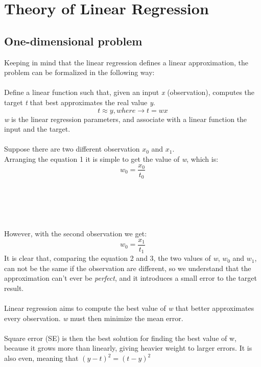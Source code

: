 \documentclass[10pt]{article}
\begin{document}
\section{Theory of Linear Regression}
\subsection{One-dimensional problem}
Keeping in mind that the linear regression defines a linear approximation, the problem can be formalized in the following way:\\\\
Define a linear function such that, given an input \textit{x} (observation), computes the target \textit{t} that best approximates the real
value \textit{y}.
\begin{equation}
    t \approx y, where \rightarrow t = wx
\end{equation}
\textit{w} is the linear regression parameters, and associate with a linear function the input and the target.\\\\
Suppose there are two different observation $x_0$ and $x_1$.\\
Arranging the equation 1 it is simple to get the value of \textit{w}, which is:
\begin{equation}
    w_0 = \frac{x_0}{t_0}
\end{equation}
\\\\\\\\\\
However, with the second observation we get:
\begin{equation}
     w_0 = \frac{x_1}{t_1}
\end{equation}
It is clear that, comparing the equation 2 and 3, the two values of \textit{w}, \textit{$w_0$} and \textit{$w_1$}, can not be the same if the observation are
different, so we understand that the approximation can’t ever
be \textit{perfect}, and it introduces a small error to the target result.\\\\
Linear regression aims to compute the best value of \textit{w} that
better approximates every observation. \textit{w} must then minimize
the mean error.\\\\
Square error (SE) is then the best solution for finding the
best value of w, because it grows more than linearly, giving
heavier weight to larger errors. It is also even, meaning that $(y - t)^2 = (t - y)^2$
\end{document}
